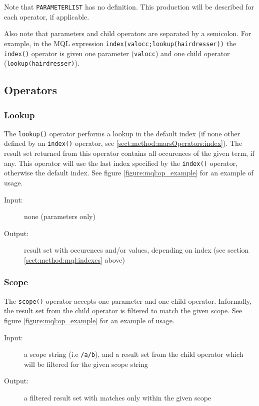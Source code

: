 Note that \texttt{PARAMETERLIST} has no definition. This production will be
described for each operator, if applicable.

Also note that parameters and child operators are separated by a semicolon. For
example, in the MQL expression \texttt{index(valocc;lookup(hairdresser))} the
\texttt{index()} operator is given one parameter (\texttt{valocc}) and one
child operator (\texttt{lookup(hairdresser)}).

\subsection{Operators}
\label{sect:method:marsOperators}
\subsubsection{Lookup}
\label{sect:method:marsOperators:lookup}
The \texttt{lookup()} operator performs a lookup in the default index (if none
other defined by an \texttt{index()} operator, see
\ref{sect:method:marsOperators:index}). The result set returned from this
operator contains all occurences of the given term, if any. This operator will
use the last index specified by the \texttt{index()} operator, otherwise the
default index. See figure \ref{figure:mql:op_example} for an example of usage. 

\begin{description}
  \item[Input:] none (parameters only)
  \item[Output:] result set with occurences and/or values, depending on index
(see section \ref{sect:method:mql:indexes} above)
\end{description}

\subsubsection{Scope}
\label{sect:method:marsOperators:scope}
The \texttt{scope()} operator accepts one parameter and one child operator. Informally, the
result set from the child operator is filtered to match the given scope. See
figure \ref{figure:mql:op_example} for an example of usage.

\begin{description}
  \item[Input:] a scope string (i.e \texttt{/a/b}), and a result set from the
child operator which will be filtered for the given scope string
  \item[Output:] a filtered result set with matches only within the given scope
\end{description}

